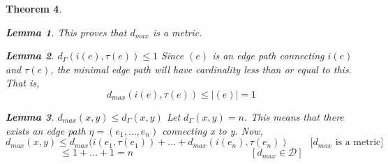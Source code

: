 \documentclass[a4paper,10pt]{book}
\newtheorem{theorem}{Theorem}[chapter]
\newtheorem{lemma}[theorem]{Lemma}
\theoremstyle{definition}
\theoremstyle{remark}
\numberwithin{section}{chapter}
\numberwithin{equation}{chapter}
\begin{document}
\begin{theorem}
\begin{lemma}
    This proves that $d_{max}$ is a metric.
  \end{lemma}
  \begin{lemma}
    $d_\Gamma (i(e),\tau (e))\leq 1$
    \proof Since $(e)$ is an edge path connecting $i(e)$ and $\tau(e)$, the minimal edge path will have cardinality less than or equal to this. That is,
    \[
      d_{max}(i(e),\tau(e))\leq |(e)| = 1
    \]
  \end{lemma}
    \begin{lemma}
     $d_{max}(x,y) \leq d_\Gamma(x,y)$
    \proof Let $ d_\Gamma(x,y) = n$.
    This means that there exists an edge path $\eta = (e_1,\dots,e_n) $ connecting x to y. Now,
    \[
     d_{max}(x,y) \leq d_{max}(i(e_1,\tau(e_1)) + \dots + d_{max}(i(e_n),\tau(e_n)) \ \ \ \ \ \ \ \ \ \  \text{[$d_{max}$ is a metric]}
    \]
    \[
     \leq 1 + \dots +1=n \hspace{2in} [d_{max} \in \mathcal{D}]
    \]


  \end{lemma}

  \end{theorem}
\end{document}
